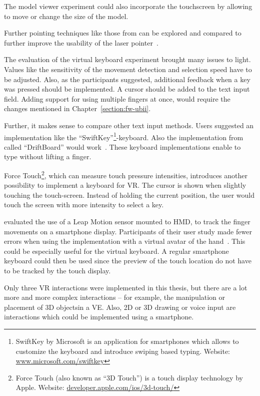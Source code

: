 The model viewer experiment could also incorporate the touchscreen by allowing to move or change the size of the model.

Further pointing techniques like those from \citeauthor{Argelaguet.2013} can be explored and compared to further improve the usability of the laser pointer~\cite[123]{Argelaguet.2013}.

The evaluation of the virtual keyboard experiment brought many issues to light. 
Values like the sensitivity of the movement detection and selection speed have to be adjusted. Also, as the participants suggested, additional feedback when a key was pressed should be implemented. A cursor should be added to the text input field. Adding support for using multiple fingers at once, would require the changes mentioned in Chapter~\ref{section:fw-ubii}.

Further, it makes sense to compare other text input methods. Users suggested an implementation like the \enquote{SwiftKey}\footnote{SwiftKey by Microsoft is an application for smartphones which allows to customize the keyboard and introduce swiping based typing. Website: \href{https://www.microsoft.com/swiftkey}{www.microsoft.com/swiftkey}}-keyboard. Also the implementation from \citeauthor{Shibata.2016} called \enquote{DriftBoard} would work~\cite{Shibata.2016}. These keyboard implementations enable to type without lifting a finger. 

Force Touch\footnote{Force Touch (also known as \enquote{3D Touch}) is a touch display technology by Apple. Website: \href{https://developer.apple.com/ios/3d-touch/}{developer.apple.com/ios/3d-touch/}}, which can measure touch pressure intensities, introduces another possibility to implement a keyboard for \ac{VR}. The cursor is shown when slightly touching the touch-screen. Instead of holding the current position, the user would touch the screen with more intensity to select a key. 

\citeauthor{Afonso.2017} evaluated the use of a Leap Motion sensor mounted to \ac{HMD}, to track the finger movements on a smartphone display. Participants of their user study made fewer errors when using the implementation with a virtual avatar of the hand~\cite[247\psq]{Afonso.2017}. This could be especially useful for the virtual keyboard. A regular smartphone keyboard could then be used since the preview of the touch location do not have to be tracked by the touch display.

Only three \ac{VR} interactions were implemented in this thesis, but there are a lot more and more complex interactions -- for example, the manipulation or placement  of \ac{3D} objectsin a \ac{VE}. Also, \ac{2D} or \ac{3D} drawing or voice input are interactions which could be implemented using a smartphone. %

